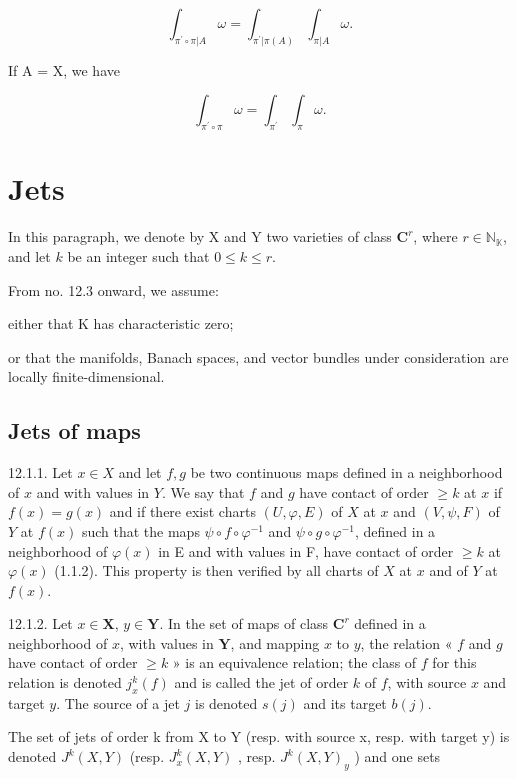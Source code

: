 \[
\int_ {\pi^ {\prime} \circ \pi | A} \omega = \int_ {\pi^ {\prime} | \pi (A)} \int_ {\pi | A} \omega .
\]

If A = X, we have

\[
\int_ {\pi^ {\prime} \circ \pi} \omega = \int_ {\pi^ {\prime}} \int_ {\pi} \omega .
\]

\section{Jets}

In this paragraph, we denote by X and Y two varieties of class \(\mathbf{C}^r\), where \(r \in \mathbb{N}_{\mathbb{K}}\), and let \(k\) be an integer such that \(0 \leqslant k \leqslant r\).

From no. 12.3 onward, we assume:

either that K has characteristic zero;

or that the manifolds, Banach spaces, and vector bundles under consideration are locally finite-dimensional.

\subsection{Jets of maps}

12.1.1. Let \(x \in X\) and let \(f, g\) be two continuous maps defined in a neighborhood of \(x\) and with values in \(Y\). We say that \(f\) and \(g\) have contact of order \(\geqslant k\) at \(x\) if \(f(x) = g(x)\) and if there exist charts \((U, \varphi, E)\) of \(X\) at \(x\) and \((V, \psi, F)\) of \(Y\) at \(f(x)\) such that the maps \(\psi \circ f \circ \varphi^{-1}\) and \(\psi \circ g \circ \varphi^{-1}\), defined in a neighborhood of \(\varphi(x)\) in E and with values in F, have contact of order \(\geqslant k\) at \(\varphi(x)\) (1.1.2). This property is then verified by all charts of \(X\) at \(x\) and of \(Y\) at \(f(x)\).

12.1.2. Let \(x \in \mathbf{X}\), \(y \in \mathbf{Y}\). In the set of maps of class \(\mathbf{C}^r\) defined in a neighborhood of \(x\), with values in \(\mathbf{Y}\), and mapping \(x\) to \(y\), the relation « \(f\) and \(g\) have contact of order \(\geqslant k\) » is an equivalence relation; the class of \(f\) for this relation is denoted \(j_x^k(f)\) and is called the jet of order \(k\) of \(f\), with source \(x\) and target \(y\). The source of a jet \(j\) is denoted \(s(j)\) and its target \(b(j)\).

The set of jets of order k from X to Y (resp. with source x, resp. with target y) is denoted \(J^{k}(X, Y)\) (resp. \(J_{x}^{k}(X, Y)\) , resp. \(J^{k}(X, Y)_{y}\) ) and one sets

